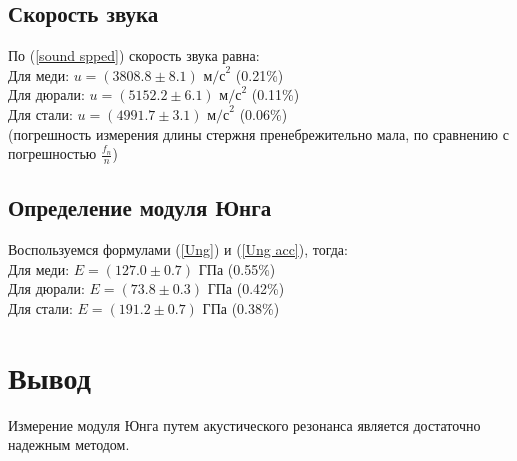 \documentclass[a4paper,10pt]{article}
\begin{document}
	\subsection{Скорость звука}
	По (\ref{sound spped}) скорость звука равна:\\
	Для меди: $u = (3808.8 \pm 8.1)\text{ м/с}^2$ (0.21\%) \\
	Для дюрали: $u = (5152.2 \pm 6.1)\text{ м/с}^2$ (0.11\%) \\
	Для стали: $u = (4991.7 \pm 3.1)\text{ м/с}^2$ (0.06\%) \\
	(погрешность измерения длины стержня пренебрежительно мала, по сравнению с погрешностью $\frac{f_n}{n}$)
	
	\subsection{Определение модуля Юнга}
	Воспользуемся формулами (\ref{Ung}) и (\ref{Ung acc}), тогда:\\
	Для меди: $E = (127.0 \pm 0.7)\text{ ГПа}$ (0.55\%) \\
	Для дюрали: $E = (73.8 \pm 0.3)\text{ ГПа}$ (0.42\%) \\
	Для стали: $E = (191.2 \pm 0.7)\text{ ГПа}$ (0.38\%)
	\section{Вывод}
	Измерение модуля Юнга путем акустического резонанса является достаточно надежным методом.
\end{document}
